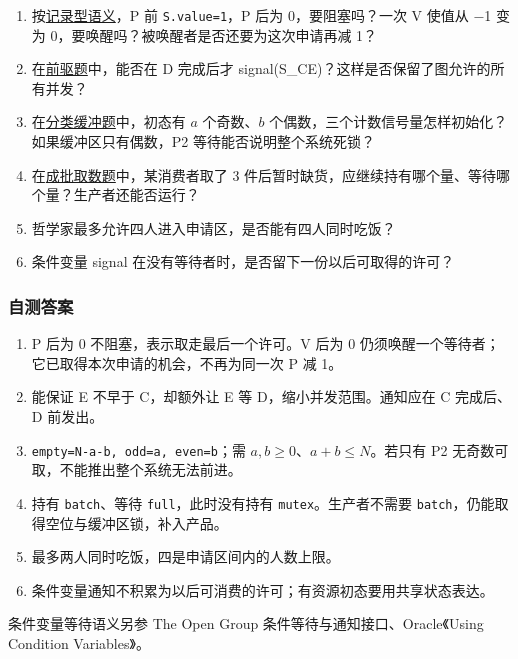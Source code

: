 \begin{enumerate}
\def\labelenumi{\arabic{enumi}.}
\tightlist
\item
  按\hyperref[OS02-semaphore]{记录型语义}，P 前 \texttt{S.value=\allowbreak{}1}，P 后为 0，要阻塞吗？一次 V 使值从 \ensuremath{-}1 变为 0，要唤醒吗？被唤醒者是否还要为这次申请再减 1？
\item
  在\hyperref[OS02-ex-2022]{前驱题}中，能否在 D 完成后才 signal(S\_CE)？这样是否保留了图允许的所有并发？
\item
  在\hyperref[OS02-ex-2009]{分类缓冲题}中，初态有 \(a\) 个奇数、\(b\) 个偶数，三个计数信号量怎样初始化？如果缓冲区只有偶数，P2 等待能否说明整个系统死锁？
\item
  在\hyperref[OS02-ex-2014]{成批取数题}中，某消费者取了 3 件后暂时缺货，应继续持有哪个量、等待哪个量？生产者还能否运行？
\item
  哲学家最多允许四人进入申请区，是否能有四人同时吃饭？
\item
  条件变量 signal 在没有等待者时，是否留下一份以后可取得的许可？
\end{enumerate}

\subsubsection{自测答案}\label{OS02-auto-22}

\begin{enumerate}
\def\labelenumi{\arabic{enumi}.}
\tightlist
\item
  P 后为 0 不阻塞，表示取走最后一个许可。V 后为 0 仍须唤醒一个等待者；它已取得本次申请的机会，不再为同一次 P 减 1。
\item
  能保证 E 不早于 C，却额外让 E 等 D，缩小并发范围。通知应在 C 完成后、D 前发出。
\item
  \texttt{empty=\allowbreak{}N-a-b,\allowbreak{} odd=\allowbreak{}a,\allowbreak{} even=\allowbreak{}b}；需 \(a,b\ge0\)、\(a+b\le N\)。若只有 P2 无奇数可取，不能推出整个系统无法前进。
\item
  持有 \texttt{batch}、等待 \texttt{full}，此时没有持有 \texttt{mutex}。生产者不需要 \texttt{batch}，仍能取得空位与缓冲区锁，补入产品。
\item
  最多两人同时吃饭，四是申请区间内的人数上限。
\item
  条件变量通知不积累为以后可消费的许可；有资源初态要用共享状态表达。
\end{enumerate}

条件变量等待语义另参 The Open Group 条件等待与通知接口、Oracle《Using Condition Variables》。

